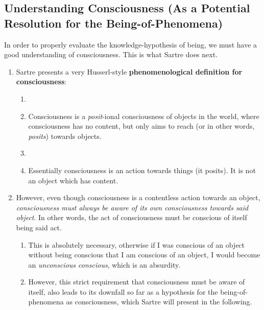 \subsection{Understanding Consciousness (As a Potential Resolution for the Being-of-Phenomena)}
In order to properly evaluate the knowledge-hypothesis of being, we must have a good understanding of consciousness. This is what Sartre does next.

\begin{enumerate}
  \item Sartre presents a very Husserl-style \textbf{phenomenological definition for consciousness}:
  \begin{enumerate}
    \item {} 
    \item Consciousness is a \emph{posit}-ional consciousness of objects in the world, where consciousness has no content, but only aims to reach (or in other words, \emph{posits}) towards objects.
    \item {}
    \item Essentially consciousness is an action towards things (it posits). It is not an object which has content.
  \end{enumerate}
  \item However, even though consciousness is a contentless action towards an object, \emph{consciousness must always be aware of its own consciousness towards said object}. In other words, the act of consciousness must be conscious of itself being said act.
  \begin{enumerate}
    \item This is absolutely necessary, otherwise if I was conscious of an object without being conscious that I am conscious of an object, I would become an \emph{unconscious conscious}, which is an absurdity.
    \item However, this strict requirement that consciousness must be aware of itself, also leads to its downfall so far as a hypothesis for the being-of-phenomena as consciousness, which Sartre will present in the following.
  \end{enumerate}
\end{enumerate}

